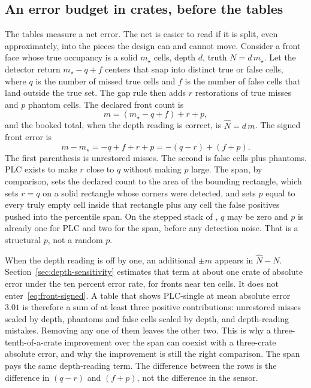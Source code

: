 \subsection{An error budget in crates, before the tables}

The tables measure a net error. The net is easier to read if it is split, even approximately, into the pieces the design can and cannot move. Consider a front face whose true occupancy is a solid $m_{\star}$ cells, depth $d$, truth $N=d\,m_{\star}$. Let the detector return $m_{\star}-q+f$ centers that snap into distinct true or false cells, where $q$ is the number of missed true cells and $f$ is the number of false cells that land outside the true set. The gap rule then adds $r$ restorations of true misses and $p$ phantom cells. The declared front count is
\begin{equation}
m = (m_{\star}-q+f) + r + p,
\label{eq:front-balance}
\end{equation}
and the booked total, when the depth reading is correct, is $\hat N = d\, m$. The signed front error is
\begin{equation}
m-m_{\star} = -q + f + r + p = -(q-r) + (f+p).
\label{eq:front-signed}
\end{equation}
The first parenthesis is unrestored misses. The second is false cells plus phantoms. PLC exists to make $r$ close to $q$ without making $p$ large. The span, by comparison, sets the declared count to the area of the bounding rectangle, which sets $r=q$ on a solid rectangle whose corners were detected, and sets $p$ equal to every truly empty cell inside that rectangle plus any cell the false positives pushed into the percentile span. On the stepped stack of , $q$ may be zero and $p$ is already one for PLC and two for the span, before any detection noise. That is a structural $p$, not a random $p$.

When the depth reading is off by one, an additional $\pm m$ appears in $\hat N-N$. Section~\ref{sec:depth-sensitivity} estimates that term at about one crate of absolute error under the ten percent error rate, for fronts near ten cells. It does not enter~\eqref{eq:front-signed}. A table that shows PLC-single at mean absolute error $3.01$ is therefore a sum of at least three positive contributions: unrestored misses scaled by depth, phantoms and false cells scaled by depth, and depth-reading mistakes. Removing any one of them leaves the other two. This is why a three-tenth-of-a-crate improvement over the span can coexist with a three-crate absolute error, and why the improvement is still the right comparison. The span pays the same depth-reading term. The difference between the rows is the difference in $(q-r)$ and $(f+p)$, not the difference in the sensor.

